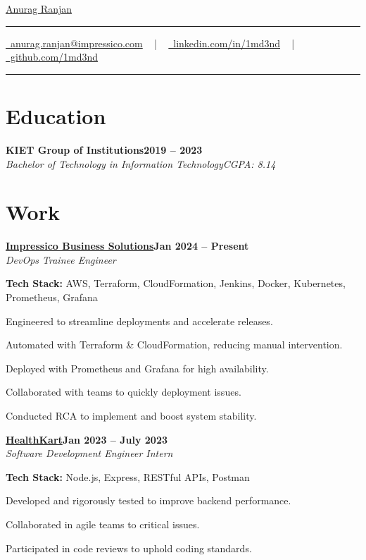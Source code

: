 \documentclass[letterpaper,10pt]{article}
\newcommand{\documentTitle}[2]{
  \begin{center}
    {\Huge\color{accentTitle} #1}
    \vspace{10pt}
    {\color{accentLine} \hrule}
    \vspace{2pt}
    \footnotesize{#2}
    \vspace{2pt}
    {\color{accentLine} \hrule}
  \end{center}
}
\newcommand{\heading}[2]{
  \hspace{10pt}#1\hfill#2\\
}
\newcommand{\headingBf}[2]{
  \heading{\textbf{#1}}{\textbf{#2}}
}
\newcommand{\headingIt}[2]{
  \heading{\textit{#1}}{\textit{#2}}
}
\newenvironment{resume_list}{
  \vspace{-7pt}
  \begin{itemize}[itemsep=-2px, parsep=1pt, leftmargin=30pt]
}{
  \end{itemize}
}
\begin{document}
\documentTitle{\href{https://1md3nd.com}{Anurag Ranjan}}{
  \href{mailto:anurag.ranjan@impressico.com}{\raisebox{-0.15\height}\faEnvelope\ anurag.ranjan@impressico.com} ~ | ~
  \href{https://linkedin.com/in/1md3nd}{\raisebox{-0.15\height}\faLinkedin\ linkedin.com/in/1md3nd} ~ | ~
  \href{https://github.com/1md3nd}{\raisebox{-0.15\height}\faGithub\ github.com/1md3nd}
}

\section{Education}

\headingBf{KIET Group of Institutions}{2019 -- 2023}
\headingIt{Bachelor of Technology in Information Technology}{CGPA: 8.14}

\section{Work}

\headingBf{ \href{https://www.impressico.com}{Impressico Business Solutions}}{Jan 2024 -- Present}  
\headingIt{DevOps Trainee Engineer}{}
\begin{resume_list}  
  \item \textbf{Tech Stack:} AWS, Terraform, CloudFormation, Jenkins, Docker, Kubernetes, Prometheus, Grafana
  \item Engineered \textbf{\color{accentTitle}{CI/CD pipelines}} to streamline deployments and accelerate releases.
  \item Automated \textbf{\color{accentTitle}{infrastructure provisioning}} with Terraform \& CloudFormation, reducing manual intervention.
  \item Deployed \textbf{\color{accentTitle}{monitoring solutions}} with Prometheus and Grafana for high availability.
  \item Collaborated with teams to quickly \textbf{\color{accentTitle}{diagnose and resolve}} deployment issues.
  \item Conducted RCA to implement \textbf{\color{accentTitle}{proactive measures}} and boost system stability.
\end{resume_list}

\headingBf{\href{https://www.healthcart.com}{HealthKart}}{Jan 2023 -- July 2023} 
\headingIt{Software Development Engineer Intern \href{https://drive.google.com/file/d/1Iz83NKtrG7A1KG_rK0P8s_sAquzRm_OY/view?usp=sharing}{\small\textit{\color{gray}{Link}}}}{}
\begin{resume_list}
  \item \textbf{Tech Stack:} Node.js, Express, RESTful APIs, Postman
  \item Developed and rigorously tested \textbf{\color{accentTitle}{RESTful APIs}} to improve backend performance.
  \item Collaborated in agile teams to \textbf{\color{accentTitle}{debug and resolve}} critical issues.
  \item Participated in code reviews to uphold coding standards.
\end{resume_list}
\end{document}
